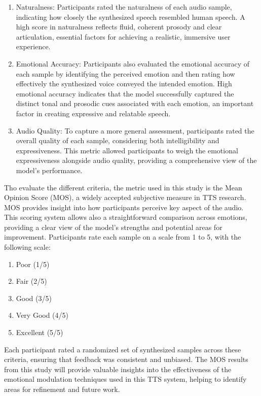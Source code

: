 \begin{enumerate}
\item Naturalness: Participants rated the naturalness of each audio sample, indicating how closely the synthesized speech resembled human speech. A high score in naturalness reflects fluid, coherent prosody and clear articulation, essential factors for achieving a realistic, immersive user experience.

\item Emotional Accuracy: Participants also evaluated the emotional accuracy of each sample by identifying the perceived emotion and then rating how effectively the synthesized voice conveyed the intended emotion. High emotional accuracy indicates that the model successfully captured the distinct tonal and prosodic cues associated with each emotion, an important factor in creating expressive and relatable speech.

\item Audio Quality: To capture a more general assessment, participants rated the overall quality of each sample, considering both intelligibility and expressiveness. This metric allowed participants to weigh the emotional expressiveness alongside audio quality, providing a comprehensive view of the model’s performance.
\end{enumerate}

Tho evaluate the different criteria, the metric used in this study is the Mean Opinion Score (MOS), a widely accepted subjective measure in TTS research. MOS provides insight into how participants perceive key aspect of the audio. This scoring system allows also a straightforward comparison across emotions, providing a clear view of the model’s strengths and potential areas for improvement. Participants rate each sample on a scale from 1 to 5, with the following scale:

\begin{enumerate}
\item Poor (1/5)
\item Fair (2/5)
\item Good (3/5)
\item Very Good (4/5)
\item Excellent (5/5)
\end{enumerate}

Each participant rated a randomized set of synthesized samples across these criteria, ensuring that feedback was consistent and unbiased. The MOS results from this study will provide valuable insights into the effectiveness of the emotional modulation techniques used in this TTS system, helping to identify areas for refinement and future work.

